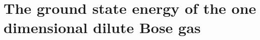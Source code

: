 \chapter{The ground state energy of the one dimensional dilute Bose gas}
\label{ChapterTheGroundStateEnergyOfTheOneDimensionalDiluteBoseGas}
